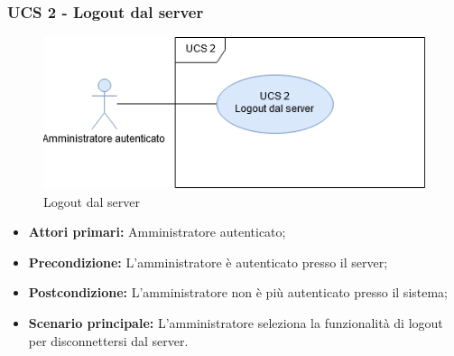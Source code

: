 \newpage

\subsubsection{UCS 2 - Logout dal server}

\begin{figure}[h]
  \centering
  \includegraphics[scale=0.6]{sezioni/UseCase/Immagini/UCS2.png}
  \caption{Logout dal server}
\end{figure}

\begin{itemize}
\item \textbf{Attori primari:} Amministratore autenticato;
\item \textbf{Precondizione:} L'amministratore è autenticato presso il server;
\item \textbf{Postcondizione:} L'amministratore non è più autenticato presso il sistema;
\item \textbf{Scenario principale:} L'amministratore seleziona la funzionalità di logout per disconnettersi dal server.
\end{itemize}
